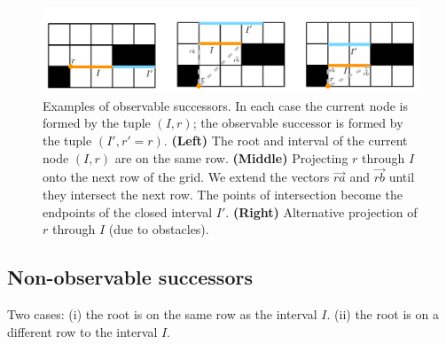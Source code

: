 \begin{figure}[tb]
\center
		   \includegraphics[width=\columnwidth]
			{images/observable.pdf}
	\vspace{-3pt}
\caption{\small
Examples of observable successors. In each case the current node is formed by the tuple $(I, r)$; the observable
successor is formed by the tuple $(I', r' = r)$. \textbf{(Left)} The root and interval of the current node $(I, r)$ are on
the same row. \textbf{(Middle)} Projecting $r$ through $I$ onto the next row of the grid. We extend the vectors $\vec{ra}$ and $\vec{rb}$
until they intersect the next row. The points of intersection become the endpoints of the closed interval $I'$. 
\textbf{(Right)} Alternative projection of $r$ through $I$ (due to obstacles).
}
\label{fig::observable}
\end{figure}

\subsection{Non-observable successors}


Two cases: (i) the root is on the same row as the interval $I$. (ii) the root is on a different row to the interval $I$.
